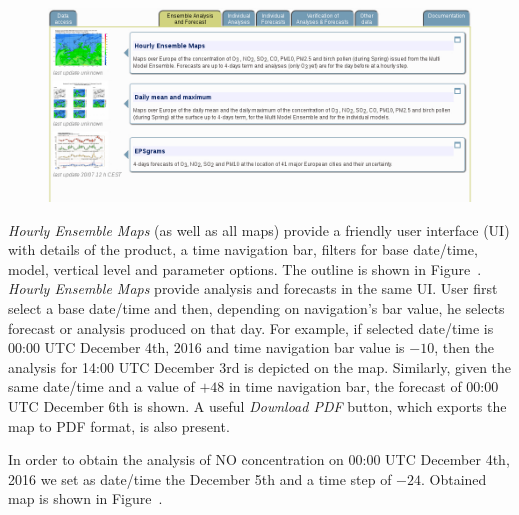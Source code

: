 \documentclass[9pt]{report}
\begin{document}
\begin{figure}[h!]%
\begin{mdcenter}%

\noindent{}\includegraphics[keepaspectratio=true,width=\dimmin{}{\dimwidth{0.90}}]{images/ensemble_tab}{}%

\mdhr{}%

\noindent{}%
\end{mdcenter}\label{ensemble-tab}%
\end{figure}%

\noindent{}\emph{Hourly Ensemble Maps} (as well as all maps) provide a friendly user interface (UI) with details of the product, a time navigation bar, filters for base date/time, model, vertical level and parameter options.
The outline is shown in Figure~.
\emph{Hourly Ensemble Maps} provide analysis and forecasts in the same UI. User first select a base date/time and then, depending on navigation's bar value, he selects forecast or analysis produced on that day.
For example, if selected date/time is 00:00 UTC December 4th, 2016 and time navigation bar value is $-10$, then the analysis for 14:00 UTC December 3rd is depicted on the map.
Similarly, given the same date/time and a value of $+48$ in time navigation bar, the forecast of 00:00 UTC December 6th is shown.
A useful \emph{Download PDF} button, which exports the map to PDF format, is also present.%

In order to obtain the analysis of NO concentration on 00:00 UTC December 4th, 2016 we set as date/time the December 5th and a time step of $-24$.
Obtained map is shown in Figure~.%
\end{document}
